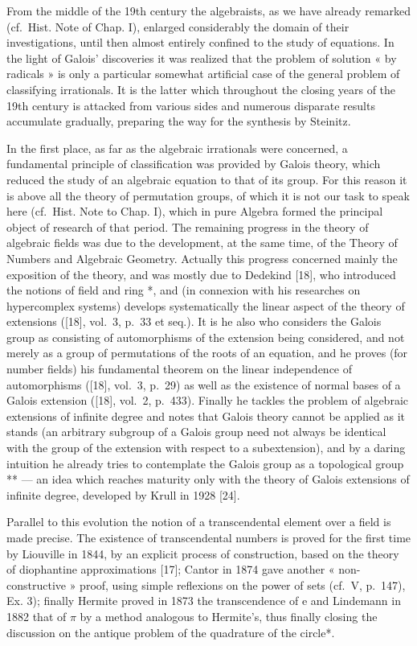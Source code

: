 From the middle of the 19th century the algebraists, as we have already remarked (cf.~Hist. Note of Chap. I), enlarged considerably the domain of their investigations, until then almost entirely confined to the study of equations. In the light of Galois' discoveries it was realized that the problem of solution « by radicals » is only a particular somewhat artificial case of the general problem of classifying irrationals. It is the latter which throughout the closing years of the 19th century is attacked from various sides and numerous disparate results accumulate gradually, preparing the way for the synthesis by Steinitz.

In the first place, as far as the algebraic irrationals were concerned, a fundamental principle of classification was provided by Galois theory, which reduced the study of an algebraic equation to that of its group. For this reason it is above all the theory of permutation groups, of which it is not our task to speak here (cf.~Hist. Note to Chap. I), which in pure Algebra formed the principal object of research of that period. The remaining progress in the theory of algebraic fields was due to the development, at the same time, of the Theory of Numbers and Algebraic Geometry. Actually this progress concerned mainly the exposition of the theory, and was mostly due to Dedekind {[}18{]}, who introduced the notions of field and ring *, and (in connexion with his researches on hypercomplex systems) develops systematically the linear aspect of the theory of extensions ({[}18{]}, vol.~3, p.~33 et seq.). It is he also who considers the Galois group as consisting of automorphisms of the extension being considered, and not merely as a group of permutations of the roots of an equation, and he proves (for number fields) his fundamental theorem on the linear independence of automorphisms ({[}18{]}, vol.~3, p.~29) as well as the existence of normal bases of a Galois extension ({[}18{]}, vol.~2, p.~433). Finally he tackles the problem of algebraic extensions of infinite degree and notes that Galois theory cannot be applied as it stands (an arbitrary subgroup of a Galois group need not always be identical with the group of the extension with respect to a subextension), and by a daring intuition he already tries to contemplate the Galois group as a topological group ** --- an idea which reaches maturity only with the theory of Galois extensions of infinite degree, developed by Krull in 1928 {[}24{]}.

Parallel to this evolution the notion of a transcendental element over a field is made precise. The existence of transcendental numbers is proved for the first time by Liouville in 1844, by an explicit process of construction, based on the theory of diophantine approximations {[}17{]}; Cantor in 1874 gave another « non-constructive » proof, using simple reflexions on the power of sets (cf.~V, p.~147), Ex. 3); finally Hermite proved in 1873 the transcendence of e and Lindemann in 1882 that of \(\pi\) by a method analogous to Hermite's, thus finally closing the discussion on the antique problem of the quadrature of the circle*.

